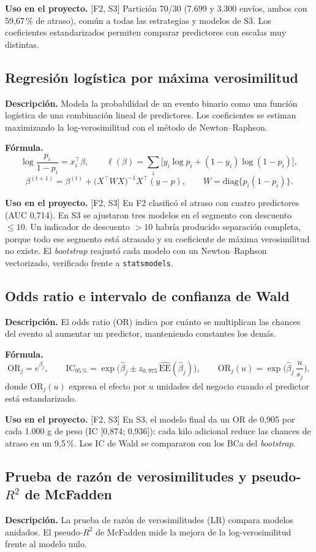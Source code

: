 \documentclass[11pt,a4paper]{article}
\newcommand{\codigo}[1]{{\small\texttt{#1}}}
\newcommand{\desc}{\textbf{Descripción.} }
\newcommand{\formula}{\textbf{Fórmula.} }
\newcommand{\uso}{\textbf{Uso en el proyecto.} }
\newcommand{\fase}[1]{{\footnotesize\color{gris}[#1]}}
\begin{document}
\uso \fase{F2, S3} Partición 70/30 (7.699 y 3.300 envíos, ambos con 59,67\,\% de atraso), común a todas las estrategias y modelos de S3. Los coeficientes estandarizados permiten comparar predictores con escalas muy distintas.

\subsection{Regresión logística por máxima verosimilitud}
\desc Modela la probabilidad de un evento binario como una función logística de una combinación lineal de predictores. Los coeficientes se estiman maximizando la log-verosimilitud con el método de Newton--Raphson.

\formula
\[
\log\frac{p_i}{1-p_i}=x_i^\top\beta,\qquad \ell(\beta)=\sum_i\big[y_i\log p_i+(1-y_i)\log(1-p_i)\big],
\]
\[
\beta^{(t+1)}=\beta^{(t)}+\big(X^\top W X\big)^{-1}X^\top(y-p),\qquad W=\mathrm{diag}\{p_i(1-p_i)\}.
\]

\uso \fase{F2, S3} En F2 clasificó el atraso con cuatro predictores (AUC 0,714). En S3 se ajustaron tres modelos en el segmento con descuento $\le10$. Un indicador de descuento $>10$ habría producido separación completa, porque todo ese segmento está atrasado y su coeficiente de máxima verosimilitud no existe. El \emph{bootstrap} reajustó cada modelo con un Newton--Raphson vectorizado, verificado frente a \codigo{statsmodels}.

\subsection{Odds ratio e intervalo de confianza de Wald}
\desc El odds ratio (OR) indica por cuánto se multiplican las chances del evento al aumentar un predictor, manteniendo constantes los demás.

\formula
\[
\mathrm{OR}_j=e^{\beta_j},\qquad \text{IC}_{95\,\%}=\exp\!\big(\hat\beta_j\pm z_{0,975}\,\widehat{\mathrm{EE}}(\hat\beta_j)\big),\qquad \mathrm{OR}_{j}(u)=\exp\!\Big(\hat\beta_j\,\frac{u}{s_j}\Big),
\]
donde $\mathrm{OR}_j(u)$ expresa el efecto por $u$ unidades del negocio cuando el predictor está estandarizado.

\uso \fase{F2, S3} En S3, el modelo final da un OR de 0,905 por cada 1.000 g de peso (IC [0,874; 0,936]): cada kilo adicional reduce las chances de atraso en un 9,5\,\%. Los IC de Wald se compararon con los BCa del \emph{bootstrap}.

\subsection{Prueba de razón de verosimilitudes y pseudo-$R^2$ de McFadden}
\desc La prueba de razón de verosimilitudes (LR) compara modelos anidados. El pseudo-$R^2$ de McFadden mide la mejora de la log-verosimilitud frente al modelo nulo.
\end{document}
